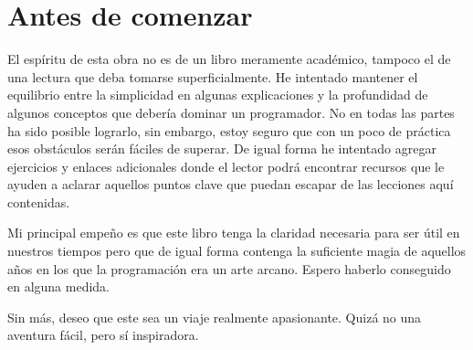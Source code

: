 \thispagestyle{empty}

\chapter{Antes de comenzar}


El espíritu de esta obra no es de un libro meramente académico, tampoco el de una lectura que deba tomarse superficialmente. He intentado mantener el equilibrio entre la simplicidad en algunas explicaciones y la profundidad de algunos conceptos que debería dominar un programador. No en todas las partes ha sido posible lograrlo, sin embargo, estoy seguro que con un poco de práctica esos obstáculos serán fáciles de superar. De igual forma he intentado agregar ejercicios y enlaces adicionales donde el lector podrá encontrar recursos que le ayuden a aclarar aquellos puntos clave que puedan escapar de las lecciones aquí contenidas.

Mi principal empeño es que este libro tenga la claridad necesaria para ser útil en nuestros tiempos pero que de igual forma contenga la suficiente magia de aquellos años en los que la programación era un arte arcano. Espero haberlo conseguido en alguna medida.

Sin más, deseo que este sea un viaje realmente apasionante. Quizá no una aventura fácil, pero sí inspiradora. 



